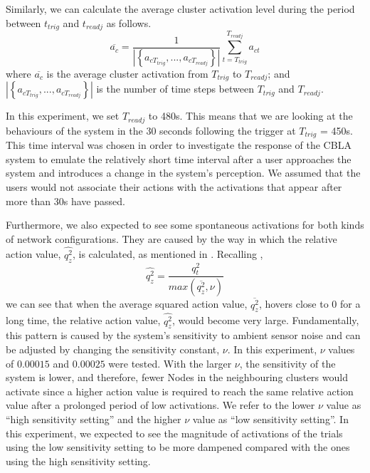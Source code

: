 Similarly, we can calculate the average cluster activation level during the period between $t_{trig}$ and $t_{readj}$ as follows.
\begin{equation}\label{eqn:average_cluster_activation}
\overline{a_c} = \frac{1}{| \left\{ a_{cT_{trig}}, ... , a_{cT_{readj}} \right\}|} \sum_{t=T_{trig}}^{T_{readj}} a_{ct}
\end{equation}
where $\overline{a_c}$ is the average cluster activation from $T_{trig}$ to $T_{readj}$; and $| \left\{ a_{cT_{trig}}, ..., a_{cT_{readj}} \right\}|$ is the number of time steps between $T_{trig}$ and $T_{readj}$.

In this experiment, we set $T_{readj}$ to 480s. This means that we are looking at the behaviours of the system in the 30 seconds following the trigger at $T_{trig}$ = 450s. This time interval was chosen in order to investigate the response of the CBLA system to emulate the relatively short time interval after a user approaches the system and introduces a change in the system's perception. We assumed that the users would not associate their actions with the activations that appear after more than 30s have passed.

Furthermore, we also expected to see some spontaneous activations for both kinds of network configurations. They are caused by the way in which the relative action value, $\widehat{q^2_z}$, is calculated, as mentioned in . Recalling 
, \[\widehat{q^2_z} = \frac{q_t^2}{max(\overline{q^2_z}, \nu)}\] we can see that when the average squared action value, $\overline{q^2_z}$, hovers close to 0 for a long time, the relative action value, $\widehat{q^2_z}$, would become very large. Fundamentally, this pattern is caused by the system's sensitivity to ambient sensor noise and can be adjusted by changing the sensitivity constant, $\nu$. In this experiment, $\nu$ values of $0.00015$ and $0.00025$ were tested. With the larger $\nu$, the sensitivity of the system is lower, and therefore, fewer Nodes in the neighbouring clusters would activate since a higher action value is required to reach the same relative action value after a prolonged period of low activations.  We refer to the lower $\nu$ value as ``high sensitivity setting'' and the higher $\nu$ value as ``low sensitivity setting''. In this experiment, we expected to see the magnitude of activations of the trials using the low sensitivity setting to be more dampened compared with the ones using the high sensitivity setting.


